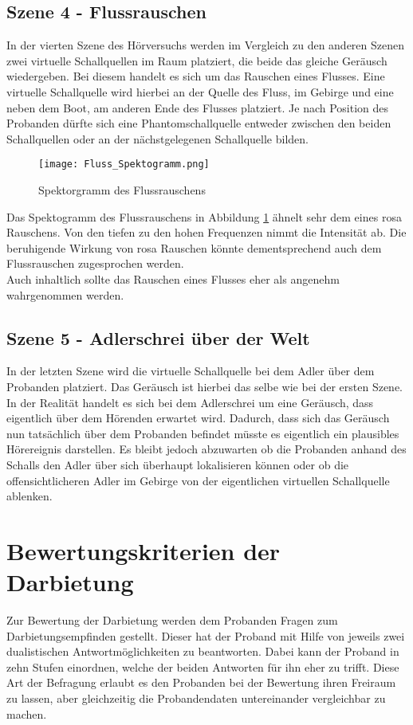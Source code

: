 \subsection{Szene 4 - Flussrauschen}
In der vierten Szene  des Hörversuchs werden im Vergleich zu den anderen Szenen zwei virtuelle Schallquellen im Raum platziert, die beide das gleiche Geräusch wiedergeben. Bei diesem handelt es sich um das Rauschen eines Flusses. Eine virtuelle Schallquelle wird hierbei an der Quelle des Fluss, im Gebirge und eine neben dem Boot, am anderen Ende des Flusses platziert. Je nach Position des Probanden dürfte sich eine Phantomschallquelle entweder zwischen den beiden Schallquellen  oder an der nächstgelegenen Schallquelle bilden. 

 \begin{figure}[H]
\centering
\texttt{[image: Fluss\_Spektogramm.png]}
\caption{Spektorgramm des Flussrauschens}
\label{fig:Fluss_Spektogramm}
\end{figure} 

Das Spektogramm des Flussrauschens in Abbildung \ref{fig:Fluss_Spektogramm} ähnelt sehr dem eines rosa Rauschens. Von den tiefen zu den hohen Frequenzen nimmt die Intensität ab. Die beruhigende Wirkung von rosa Rauschen könnte dementsprechend  auch dem Flussrauschen zugesprochen werden. \\ 

Auch inhaltlich sollte das Rauschen eines Flusses eher als angenehm wahrgenommen werden. 

\subsection{Szene 5 - Adlerschrei über der Welt}
In der letzten Szene wird die virtuelle Schallquelle bei dem Adler über dem Probanden platziert. Das Geräusch ist hierbei das selbe wie bei der ersten Szene. \\ 

In der Realität handelt es sich bei dem Adlerschrei um eine Geräusch, dass eigentlich über dem Hörenden erwartet wird. Dadurch, dass sich das Geräusch nun tatsächlich über dem Probanden befindet müsste es eigentlich ein plausibles Hörereignis darstellen. Es bleibt jedoch abzuwarten ob die Probanden anhand des Schalls den Adler über sich überhaupt lokalisieren können oder ob die offensichtlicheren Adler im Gebirge von der eigentlichen virtuellen Schallquelle ablenken.  

 \section{Bewertungskriterien der Darbietung}
 Zur Bewertung der Darbietung werden dem Probanden Fragen zum Darbietungsempfinden gestellt. Dieser hat der Proband mit Hilfe von jeweils  zwei dualistischen  Antwortmöglichkeiten zu beantworten. Dabei kann der Proband in zehn Stufen einordnen, welche der beiden Antworten für ihn eher zu trifft. Diese Art der Befragung erlaubt es den Probanden bei der Bewertung ihren Freiraum zu lassen, aber gleichzeitig die Probandendaten untereinander vergleichbar zu machen.  \\
 
